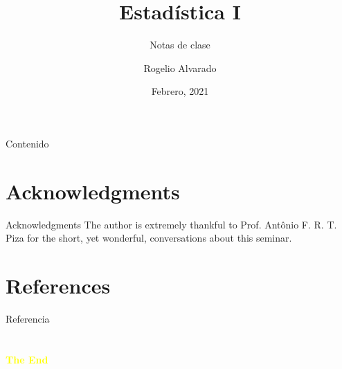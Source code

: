\documentclass[aspectratio=44]{beamer}
\title{Estadística I} %
\subtitle{Notas de clase}
\author[rmalvaradom]{Rogelio Alvarado}
\institute[POLI]{
    Ciencias Básicas%
    \\%
    Politécnico Grancolombiano%
} %
\date{Febrero, 2021}
\begin{document}
    
    \frame{\titlepage}
    
    \begin{frame}{Contenido}
        \tableofcontents
    \end{frame}
    
    
    
    
    
    
    \section*{Acknowledgments} %
        \begin{frame}{Acknowledgments}
            The author is extremely thankful to Prof. Antônio F. R. T. Piza for the short, yet wonderful, conversations about this seminar.
        \end{frame}
    
    \section*{References} %
        \nocite{Djairo} \nocite{PhilPanof} \nocite{Fleming} \nocite{Shankar}
        \begin{frame}{Referencia}
            \printbibliography
        \end{frame}

    \section{}
    \begin{frame}{}
        \centering
            \Huge\bfseries
        \textcolor{yellow}{The End}
    \end{frame}
\end{document}
